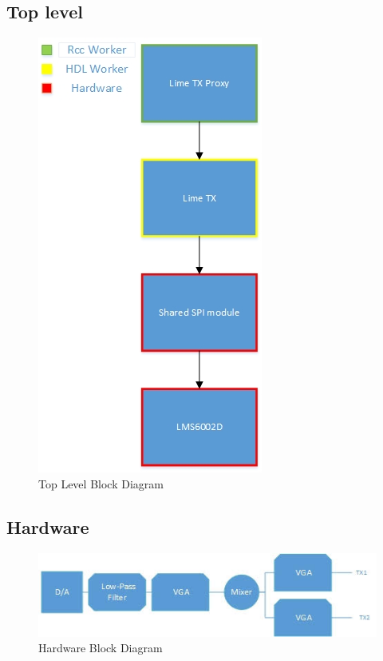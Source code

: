 \documentclass{article}
\begin{document}
\subsection*{Top level}
\begin{figure}[ht]
	\centerline{\includegraphics[scale=0.7]{lime_TX_toplevel}}
	\caption{Top Level Block Diagram}
	\label{fig:top}
\end{figure}
\vspace{25 mm}

\subsection*{Hardware}
\begin{figure}[ht]
	\centerline{\includegraphics[scale=0.7]{lime_TX_HW}}
	\caption{Hardware Block Diagram}
	\label{fig:hw}
\end{figure}
\vspace{25 mm}
\end{document}
